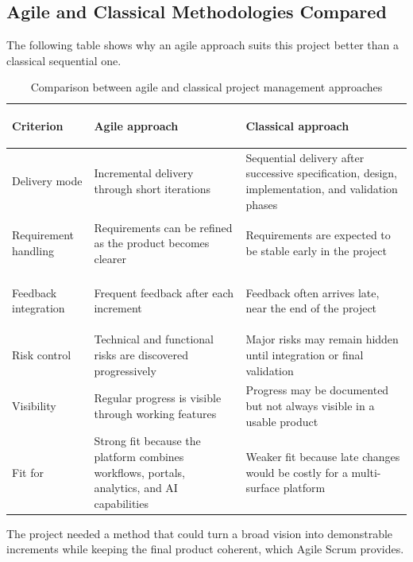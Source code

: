 \subsection{Agile and Classical Methodologies Compared}
The following table shows why an agile approach suits this project better than a classical sequential one.
\begin{table}[H]
  \centering
  \caption{Comparison between agile and classical project management approaches}
  \begin{tabularx}{\textwidth}{>{\bfseries\raggedright\arraybackslash}p{3.5cm}XX}
    \toprule
    Criterion & Agile approach & Classical approach \\
    \midrule
    Delivery mode & Incremental delivery through short iterations & Sequential delivery after successive specification, design, implementation, and validation phases \\
    Requirement handling & Requirements can be refined as the product becomes clearer & Requirements are expected to be stable early in the project \\
    Feedback integration & Frequent feedback after each increment & Feedback often arrives late, near the end of the project \\
    Risk control & Technical and functional risks are discovered progressively & Major risks may remain hidden until integration or final validation \\
    Visibility & Regular progress is visible through working features & Progress may be documented but not always visible in a usable product \\
    Fit for \projectname{} & Strong fit because the platform combines workflows, portals, analytics, and AI capabilities & Weaker fit because late changes would be costly for a multi-surface platform \\
    \bottomrule
  \end{tabularx}
\end{table}
The project needed a method that could turn a broad vision into demonstrable increments while keeping the final product coherent, which Agile Scrum provides.
